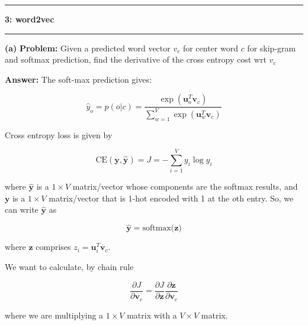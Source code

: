 \documentclass[11pt]{article}
\newcommand\question[2]{\vspace{.25in}\hrule\textbf{#1: #2}\vspace{.5em}\hrule\vspace{.10in}}
\renewcommand\part[1]{\vspace{.10in}\textbf{(#1)}}
\newcommand\problem{\vspace{.10in}\textbf{Problem: }}
\newcommand\answer{\vspace{.10in}\textbf{Answer: }}
\newcommand{\softmax}[1]{\text{softmax}{(#1})}
\begin{document}
\raggedright
\newcommand\NAME{Last Feremenga}  %
\newcommand\HWNUM{1}              %


\question{3}{word2vec}

\part{a} \problem Given a predicted word vector $v_c$ for center word $c$ for skip-gram and softmax
prediction, find the derivative of the cross entropy cost wrt $v_c$

\answer The soft-max prediction gives:

\begin{equation}
  \hat{y}_o = p(o|c) = \frac{\exp{(\bm{u}_o^T\bm{v}_c)}}{\sum_{w=1}^V\exp{(\bm{u}_w^T\bm{v}_c)}}
\end{equation}

Cross entropy loss is given by 

\begin{equation}
  \text{CE}(\bm{y}, \bm{\hat{y}}) = J = -\sum_{i=1}^Vy_i\log{\hat{y}_i}
\end{equation}

where $\bm{\hat{y}}$ is a $1\times V$ matrix/vector whose components are the softmax results, and 
$\bm{y}$ is a $1\times V$ matrix/vector that is 1-hot encoded with 1 at the $o$th entry. So, 
we can write $\bm{\hat{y}}$ as 

\begin{equation}
  \bm{\hat{y}} = \softmax{\bm{z}}
\end{equation}

where $\bm{z}$ comprises $z_i = \bm{u}_i^T\bm{v}_c$.

We want to calculate, by chain rule

\begin{equation}
  \frac{\partial J}{\partial \bm{v}_c} =  \frac{\partial J}{\partial \bm{z}}\frac{\partial\bm{z}}{\partial \bm{v}_c}
\end{equation}

where we are multiplying a $1\times V$ matrix with a $V\times V$ matrix.
\end{document}
